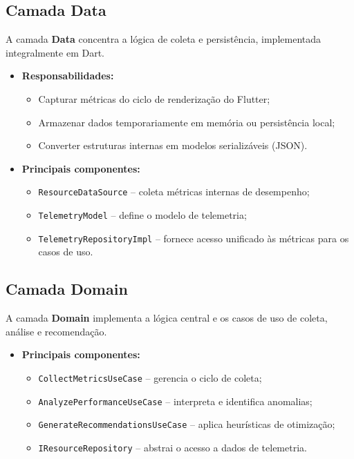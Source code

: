 \documentclass[12pt,a4paper,oneside]{abntex2}
\begin{document}
\subsection{Camada Data}

A camada \textbf{Data} concentra a lógica de coleta e persistência, implementada integralmente em Dart.

\begin{itemize}
  \item \textbf{Responsabilidades:}
    \begin{itemize}
      \item Capturar métricas do ciclo de renderização do Flutter;
      \item Armazenar dados temporariamente em memória ou persistência local;
      \item Converter estruturas internas em modelos serializáveis (JSON).
    \end{itemize}
  \item \textbf{Principais componentes:}
    \begin{itemize}
      \item \texttt{ResourceDataSource} – coleta métricas internas de desempenho;
      \item \texttt{TelemetryModel} – define o modelo de telemetria;
      \item \texttt{TelemetryRepositoryImpl} – fornece acesso unificado às métricas para os casos de uso.
    \end{itemize}
\end{itemize}

\subsection{Camada Domain}

A camada \textbf{Domain} implementa a lógica central e os casos de uso de coleta, análise e recomendação.

\begin{itemize}
  \item \textbf{Principais componentes:}
    \begin{itemize}
      \item \texttt{CollectMetricsUseCase} – gerencia o ciclo de coleta;
      \item \texttt{AnalyzePerformanceUseCase} – interpreta e identifica anomalias;
      \item \texttt{GenerateRecommendationsUseCase} – aplica heurísticas de otimização;
      \item \texttt{IResourceRepository} – abstrai o acesso a dados de telemetria.
    \end{itemize}
\end{itemize}
\end{document}
